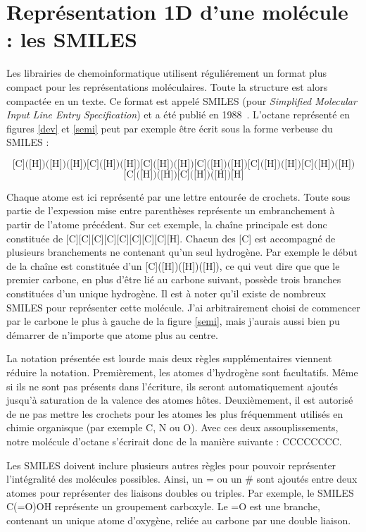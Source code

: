 \section{Représentation 1D d'une molécule : les SMILES}

Les librairies de chemoinformatique utilisent réguliérement un format plus compact pour les représentations moléculaires.
Toute la structure est alors compactée en un texte.
Ce format est appelé SMILES (pour \textit{Simplified Molecular Input Line Entry Specification}) et a été publié en 1988~\cite{weininger_smiles_1988}.
L'octane représenté en figures \ref{dev} et \ref{semi} peut par exemple être écrit sous la forme verbeuse du SMILES :

\[\text{[C]([H])([H])([H])[C]([H])([H])[C]([H])([H])[C]([H])([H])[C]([H])([H])[C]([H])([H])}\]
\[\text{[C]([H])([H])[C]([H])([H])[H]}\]

Chaque atome est ici représenté par une lettre entourée de crochets.
Toute sous partie de l'expession mise entre parenthèses représente un embranchement à partir de l'atome précédent.
Sur cet exemple, la chaîne principale est donc constituée de [C][C][C][C][C][C][C][C][H].
Chacun des [C] est accompagné de plusieurs branchements ne contenant qu'un seul hydrogène.
Par exemple le début de la chaîne est constituée d'un [C]([H])([H])([H]), ce qui veut dire que que le premier carbone, en plus d'être lié au carbone suivant, possède trois branches constituées d'un unique hydrogène.
Il est à noter qu'il existe de nombreux SMILES pour représenter cette molécule.
J'ai arbitrairement choisi de commencer par le carbone le plus à gauche de la figure \ref{semi}, mais j'aurais aussi bien pu démarrer de n'importe que atome plus au centre.

La notation présentée est lourde mais deux règles supplémentaires viennent réduire la notation.
Premièrement, les atomes d'hydrogène sont facultatifs.
Même si ils ne sont pas présents dans l'écriture, ils seront automatiquement ajoutés jusqu'à saturation de la valence des atomes hôtes.
Deuxièmement, il est autorisé de ne pas mettre les crochets pour les atomes les plus fréquemment utilisés en chimie organisque (par exemple C, N ou O).
Avec ces deux assouplissements, notre molécule d'octane s'écrirait donc de la manière suivante : CCCCCCCC.

Les SMILES doivent inclure plusieurs autres règles pour pouvoir représenter l'intégralité des molécules possibles.
Ainsi, un = ou un \# sont ajoutés entre deux atomes pour représenter des liaisons doubles ou triples.
Par exemple, le SMILES C(=O)OH représente un groupement carboxyle.
Le =O est une branche, contenant un unique atome d'oxygène, reliée au carbone par une double liaison.

